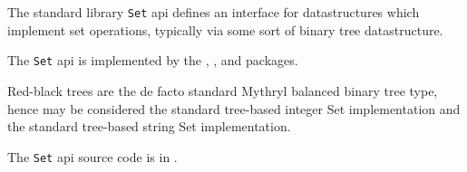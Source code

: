 
The standard library {\tt Set} api defines an interface for datastructures  
which implement set operations, typically via some sort of binary tree 
datastructure.

The {\tt Set} api is implemented by the 
, 
, 
 and 
packages.

Red-black trees are the de facto standard Mythryl balanced binary 
tree type, hence 
 may be considered 
the standard tree-based integer Set implementation and 
 the standard tree-based string Set 
implementation.

The {\tt Set} api source code is in .






